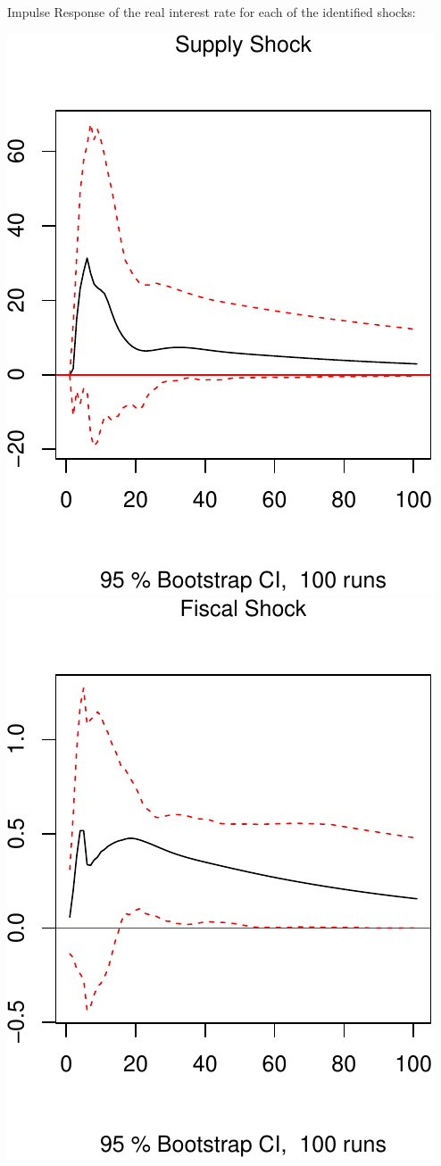 \documentclass[11pt,preprint, authoryear]{elsarticle}
\numberwithin{equation}{section}
\numberwithin{figure}{section}
\numberwithin{table}{section}
\begin{document}
Impulse Response of the real interest rate for each of the identified
shocks:

\includegraphics{TS_proj_files/figure-latex/unnamed-chunk-31-1.pdf}
\includegraphics{TS_proj_files/figure-latex/unnamed-chunk-31-2.pdf}
\end{document}
